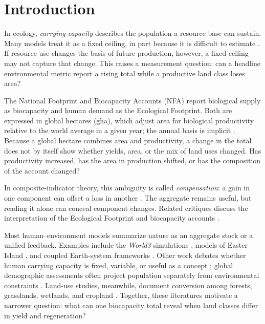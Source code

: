 \documentclass[preprint,12pt,authoryear]{elsarticle}
\begin{document}
\section{Introduction}\label{sec:intro}

In ecology, \emph{carrying capacity} describes the population a resource base can sustain. Many models treat it as a fixed ceiling, in part because it is difficult to estimate \citep{Cohen1995}. If resource use changes the basis of future production, however, a fixed ceiling may not capture that change. This raises a measurement question: can a headline environmental metric report a rising total while a productive land class loses area?

The National Footprint and Biocapacity Accounts (NFA) report biological supply as biocapacity and human demand as the Ecological Footprint. Both are expressed in global hectares (gha), which adjust area for biological productivity relative to the world average in a given year; the annual basis is implicit \citep{GFNStandards2009,GFNGuidebook2019}. Because a global hectare combines area and productivity, a change in the total does not by itself show whether yields, area, or the mix of land uses changed. Has productivity increased, has the area in production shifted, or has the composition of the account changed?

In composite-indicator theory, this ambiguity is called \emph{compensation}: a gain in one component can offset a loss in another \citep{Nardo2008,Becker2017,Fischer2022}. The aggregate remains useful, but reading it alone can conceal component changes. Related critiques discuss the interpretation of the Ecological Footprint and biocapacity accounts \citep{Blomqvist2013,GiampietroSaltelli2014,vdBerghGrazi2015,Galli2016}.

Most human--environment models summarize nature as an aggregate stock or a unified feedback. Examples include the \emph{World3} simulations \citep{Meadows1972,Meadows1974,Meadows2004}, models of Easter Island \citep{BranderTaylor1998,Anderies2000}, and coupled Earth-system frameworks \citep{Motesharrei2016,Donges2017,CalvinBondLamberty2018,HendersonLoreau2018}. Other work debates whether human carrying capacity is fixed, variable, or useful as a concept \citep{Cohen1995,vdBerghRietveld2004,Simon1996,Meyer1994,MeyerAusubel1999,Dasgupta2021}; global demographic assessments often project population separately from environmental constraints \citep{UN2022}. Land-use studies, meanwhile, document conversion among forests, grasslands, wetlands, and cropland \citep{Haberl2007,Krausmann2013,Erb2017}. Together, these literatures motivate a narrower question: what can one biocapacity total reveal when land classes differ in yield and regeneration?
\end{document}
